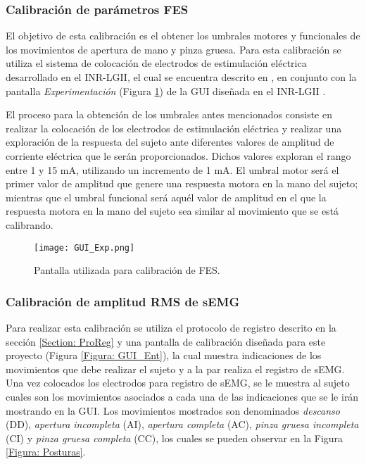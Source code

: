 \subsubsection{Calibración de parámetros FES}
El objetivo de esta calibración es el obtener los umbrales motores y funcionales de los movimientos de apertura de mano y pinza gruesa. Para esta calibración se utiliza el sistema de colocación de electrodos de estimulación eléctrica desarrollado en el INR-LGII, el cual se encuentra descrito en \cite{AnaMartin2019}, en conjunto con la pantalla \emph{Experimentación} (Figura \ref{Figura: GUI_Exp}) de la GUI diseñada en el INR-LGII \cite{JanethFuentes2018}.

El proceso para la obtención de los umbrales antes mencionados consiste en realizar la colocación de los electrodos de estimulación eléctrica y realizar una exploración de la respuesta del sujeto ante diferentes valores de amplitud de corriente eléctrica que le serán proporcionados. Dichos valores exploran el rango entre 1 y 15 mA, utilizando un incremento de 1 mA. El umbral motor será el primer valor de amplitud que genere una respuesta motora en la mano del sujeto; mientras que el umbral funcional será aquél valor de amplitud en el que la respuesta motora en la mano del sujeto sea similar al movimiento que se está calibrando.

\begin{figure}[htb]
	\centering
	\texttt{[image: GUI\_Exp.png]}
	\caption{Pantalla utilizada para calibración de FES.}
	\label{Figura: GUI_Exp}
\end{figure}

\subsubsection{Calibración de amplitud RMS de sEMG}
Para realizar esta calibración se utiliza el protocolo de registro descrito en la sección \ref{Section: ProReg} y una pantalla de calibración diseñada para este proyecto (Figura \ref{Figura: GUI_Ent}), la cual muestra indicaciones de los movimientos que debe realizar el sujeto y a la par realiza el registro de sEMG. Una vez colocados los electrodos para registro de sEMG, se le muestra al sujeto cuales son los movimientos asociados a cada una de las indicaciones que se le irán mostrando en la GUI. Los movimientos mostrados son denominados \emph{descanso} (DD), \emph{apertura incompleta} (AI), \emph{apertura completa} (AC), \emph{pinza gruesa incompleta} (CI) y \emph{pinza gruesa completa} (CC), los cuales se pueden observar en la Figura \ref{Figura: Posturas}.

